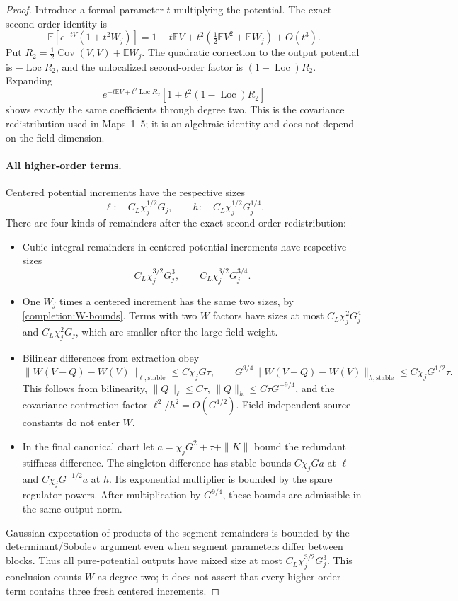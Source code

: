 \documentclass[11pt]{article}
\begin{document}
\begin{proof}
Introduce a formal parameter \(t\) multiplying the potential. The exact
second-order identity is
\[
 \mathbb E[e^{-tV}(1+t^2W_j)]
 =1-t\mathbb EV+t^2\left(\tfrac12\mathbb EV^2+\mathbb EW_j\right)
       +O(t^3).
\]
Put \(R_2=\tfrac12\operatorname{Cov}(V,V)+\mathbb EW_j\).
The quadratic correction to the output potential is
\(-\operatorname{Loc}R_2\), and the unlocalized second-order factor is
\((1-\operatorname{Loc})R_2\). Expanding
\[
 e^{-t\mathbb EV+t^2\operatorname{Loc}R_2}
       [1+t^2(1-\operatorname{Loc})R_2]
\]
shows exactly the same coefficients through degree two. This is the
covariance redistribution used in Maps~1--5; it is an algebraic identity
and does not depend on the field dimension.

\paragraph{All higher-order terms.}
Centered potential increments have the respective sizes
\[
 \ell:\quad C_L\chi_j^{1/2}G_j,\qquad
 h:\quad C_L\chi_j^{1/2}G_j^{1/4}.
\]
There are four kinds of remainders after the exact second-order
redistribution:
\begin{itemize}
\item Cubic integral remainders in centered potential increments have
respective sizes
\[
 C_L\chi_j^{3/2}G_j^3,\qquad C_L\chi_j^{3/2}G_j^{3/4}.
\]
\item One \(W_j\) times a centered increment has the same two sizes,
by \eqref{completion:W-bounds}. Terms with two \(W\) factors have
sizes at most \(C_L\chi_j^2G_j^4\) and
\(C_L\chi_j^2G_j\), which are smaller after the large-field weight.
\item Bilinear differences from extraction obey
\[
 \|W(V-Q)-W(V)\|_{\ell,\mathrm{stable}}
       \le C\chi_jG\tau,\qquad
 G^{9/4}\|W(V-Q)-W(V)\|_{h,\mathrm{stable}}
       \le C\chi_jG^{1/2}\tau.
\]
This follows from bilinearity, \(\|Q\|_\ell\le C\tau\),
\(\|Q\|_h\le C\tau G^{-9/4}\), and the covariance contraction
factor \(\ell^2/h^2=O(G^{1/2})\). Field-independent source constants
do not enter \(W\).
\item In the final canonical chart let
\(a=\chi_jG^2+\tau+\|K\|\) bound the redundant stiffness difference.
The singleton difference has stable bounds
\(C\chi_jGa\) at \(\ell\) and
\(C\chi_jG^{-1/2}a\) at \(h\). Its exponential multiplier is bounded
by the spare regulator powers. After multiplication by \(G^{9/4}\),
these bounds are admissible in the same output norm.
\end{itemize}
Gaussian expectation of products of the segment remainders is bounded
by the determinant/Sobolev argument even when segment parameters differ
between blocks. Thus all pure-potential outputs have mixed size at most
\(C_L\chi_j^{3/2}G_j^3\). This conclusion counts \(W\) as degree two;
it does not assert that every higher-order term contains three fresh
centered increments.


\end{proof}
\end{document}
